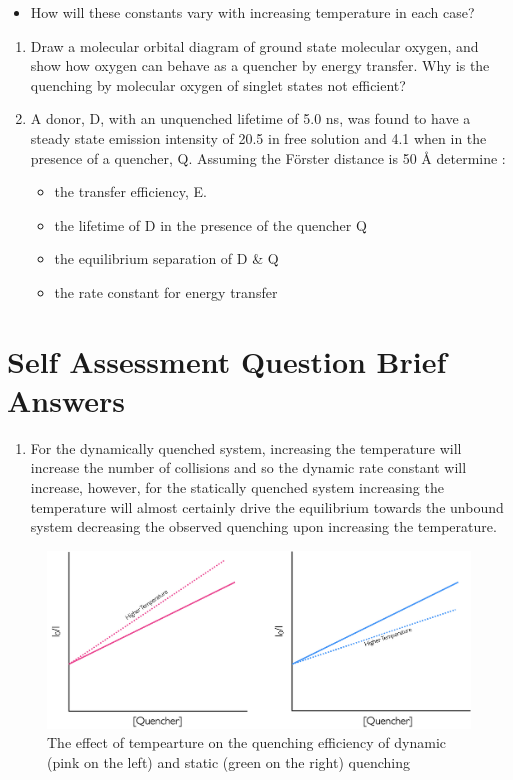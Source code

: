 \documentclass[
]{book}
\providecommand{\tightlist}{%
  \setlength{\itemsep}{0pt}\setlength{\parskip}{0pt}}
\begin{document}
\begin{itemize}
\tightlist
\item
  How will these constants vary with increasing temperature in each case?
\end{itemize}

\begin{enumerate}
\def\labelenumi{\arabic{enumi}.}
\setcounter{enumi}{1}
\item
  Draw a molecular orbital diagram of ground state molecular oxygen, and show how oxygen can behave as a quencher by energy transfer. Why is the quenching by molecular oxygen of singlet states not efficient?
\item
  A donor, D, with an unquenched lifetime of 5.0 ns, was found to have a steady state emission intensity of 20.5 in free solution and 4.1 when in the presence of a quencher, Q. Assuming the Förster distance is 50 Å determine :

  \begin{itemize}
  \tightlist
  \item
    the transfer efficiency, E.
  \item
    the lifetime of D in the presence of the quencher Q
  \item
    the equilibrium separation of D \& Q
  \item
    the rate constant for energy transfer
  \end{itemize}
\end{enumerate}

\hypertarget{sec:SAQquenchans}{%
\section{Self Assessment Question Brief Answers}\label{sec:SAQquenchans}}

\begin{enumerate}
\def\labelenumi{\arabic{enumi}.}
\tightlist
\item
  For the dynamically quenched system, increasing the temperature will increase the number of collisions and so the dynamic rate constant will increase, however, for the statically quenched system increasing the temperature will almost certainly drive the equilibrium towards the unbound system decreasing the observed quenching upon increasing the temperature.
\end{enumerate}

\begin{figure}

{\centering \includegraphics[width=0.7\linewidth]{images/quenchintensityconc} 

}

\caption{The effect of tempearture on the quenching efficiency of dynamic (pink on the left) and static (green on the right) quenching}\label{fig:quenchintensityconc}
\end{figure}
\end{document}
